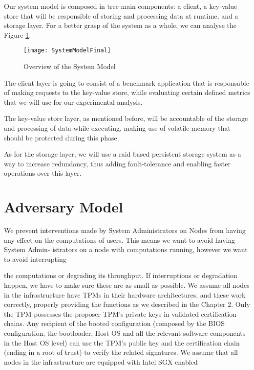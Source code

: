 Our system model is composed in tree main components: a client, a key-value store that will be responsible of storing and processing data at runtime, and a storage layer. For a better grasp of the system as a whole, we can analyse the Figure \ref{fig:systemModel}.

\begin{figure}[htbp]
	\centering
	{\texttt{[image: SystemModelFinal]}}
	\caption{Overview of the System Model}
	\label{fig:systemModel}
\end{figure}

The client layer is going to consist of a benchmark application that is responsable of making requests to the key-value store, while evaluating certain defined metrics that we will use for our experimental analysis.

The key-value store layer, as mentioned before, will be accountable of the storage and processing of data while executing, making use of volatile memory that should be protected during this phase.

As for the storage layer, we will use a \gls{raid} based persistent storage system as a way to increase redundancy, thus adding fault-tolerance and enabling faster operations over this layer.




\section{Adversary Model} %
\label{sec:inserting_tables}

We prevent interventions made by System Administrators on Nodes from having any
effect on the computations of users. This means we want to avoid having System Admin-
istrators on a node with computations running, however we want to avoid interrupting

the computations or degrading its throughput. If interruptions or degradation happen,
we have to make sure these are as small as possible.
We assume all nodes in the infrastructure have TPMs in their hardware architectures,
and these work correctly, properly providing the functions as we described in the Chapter
2. Only the TPM possesses the proposer TPM’s private keys in validated certification
chains. Any recipient of the booted configuration (composed by the BIOS configuration,
the bootloader, Host OS and all the relevant software components in the Host OS level)
can use the TPM’s public key and the certification chain (ending in a root of trust) to
verify the related signatures.
We assume that all nodes in the infrastructure are equipped with Intel SGX enabled

